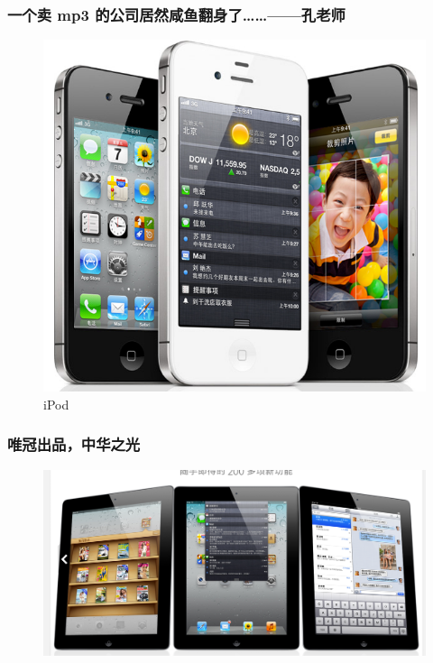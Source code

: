 \documentclass[utf8x, notes=hide]{beamer}
\begin{document}
\begin{frame}
\frametitle{一个卖 mp3 的公司居然咸鱼翻身了……——孔老师}
  \begin{figure}
    \centering
    \includegraphics[bb=0 0 1003 830,scale=.2]{images/iPhone.png}    
    \caption{iPod}
    \label{fig:iPod}
  \end{figure}
\end{frame}
\begin{frame}
\frametitle{唯冠出品，中华之光}
  \begin{figure}
    \centering
    \includegraphics[bb=0 0 1004 489,scale=.2]{images/iPad.png}
    \label{fig:iPad}
  \end{figure}
\end{frame}
\end{document}
